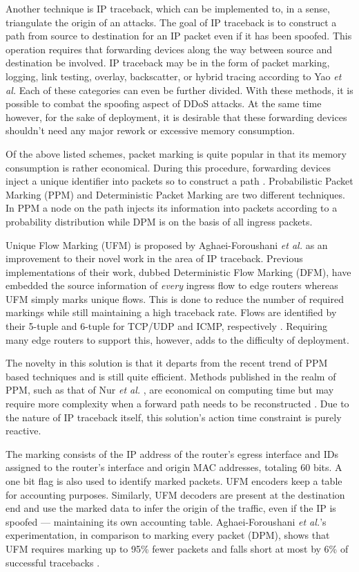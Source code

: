 \documentclass[conference]{IEEEtran}
\begin{document}
Another technique is IP traceback, which can be implemented to, in a sense, triangulate the origin of an attacks. The goal of IP traceback is to construct a path from source to destination for an IP packet even if it has been spoofed. This operation requires that forwarding devices along the way between source and destination be involved. IP traceback may be in the form of packet marking, logging, link testing, overlay, backscatter, or hybrid tracing according to Yao \textit{et al.} Each of these categories can even be further divided. With these methods, it is possible to combat the spoofing aspect of DDoS attacks. At the same time however, for the sake of deployment, it is desirable that these forwarding devices shouldn’t need any major rework or excessive memory consumption.

Of the above listed schemes, packet marking is quite popular in that its memory consumption is rather economical. During this procedure, forwarding devices inject a unique identifier into packets so to construct a path \cite{Yao:IPTraceback}. Probabilistic Packet Marking (PPM) and Deterministic Packet Marking are two different techniques. In PPM a node on the path injects its information into packets according to a probability distribution while DPM is on the basis of all ingress packets.

Unique Flow Marking (UFM) is proposed by Aghaei-Foroushani \textit{et al.} as an improvement to their novel work in the area of IP traceback. Previous implementations of their work, dubbed Deterministic Flow Marking (DFM), have embedded the source information of \textit{every} ingress flow to edge routers whereas UFM simply marks unique flows. This is done to reduce the number of required markings while still maintaining a high traceback rate. Flows are identified by their 5-tuple and 6-tuple for TCP/UDP and ICMP, respectively \cite{Aghaei:UFM}. Requiring many edge routers to support this, however, adds to the difficulty of deployment. 

The novelty in this solution is that it departs from the recent trend of PPM based techniques and is still quite efficient. Methods published in the realm of PPM, such as that of Nur \textit{et al.} \cite{Nur:CyPhy}, are economical on computing time but may require more complexity when a forward path needs to be reconstructed \cite{Aghaei:UFM}. Due to the nature of IP traceback itself, this solution's action time constraint is purely reactive.

The marking consists of the IP address of the router's egress interface and IDs assigned to the router's interface and origin MAC addresses, totaling 60 bits. A one bit flag is also used to identify marked packets. UFM encoders keep a table for accounting purposes. Similarly, UFM decoders are present at the destination end and use the marked data to infer the origin of the traffic, even if the IP is spoofed --- maintaining its own accounting table. Aghaei-Foroushani \textit{et al.}'s experimentation, in comparison to marking every packet (DPM), shows that UFM requires marking up to 95\% fewer packets and falls short at most by 6\% of successful tracebacks \cite{Aghaei:UFM}.
\end{document}
